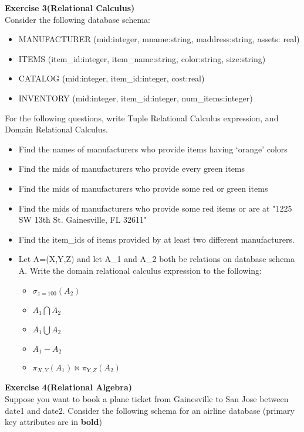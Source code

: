 \documentclass[12pt]{article}
\begin{document}
\newpage
\textbf{Exercise 3(Relational Calculus)}\\

Consider the following database schema:
\begin{itemize}
\item MANUFACTURER (mid:integer, mname:string, maddress:string, assets: real)
\item ITEMS (item\_id:integer, item\_name:string, color:string, size:string)
\item CATALOG (mid:integer, item\_id:integer, cost:real)
\item INVENTORY (mid:integer, item\_id:integer, num\_items:integer)
\end{itemize}
For the following questions, write Tuple Relational Calculus
expression, and Domain Relational Calculus.
\begin{itemize}
\item
Find the names of manufacturers who provide items having ‘orange’ colors 
\item
Find the mids of manufacturers who provide every green items 
\item
Find the mids of manufacturers who provide some red or green items
\item 
Find the mids of manufacturers who provide some red items or are at "1225 SW 13th St.
Gainesville, FL 32611"
\item
Find the item\_ids of items provided by at least two different manufacturers.
\item 
Let A=(X,Y,Z) and let A\_1 and A\_2 both be relations on database schema A.
Write the domain relational calculus expression to the following:
\begin{itemize}
\item $\sigma_{z=100}(A_2)$
\item $A_1 \bigcap A_2$
\item $A_1 \bigcup A_2$
\item $A_1 - A_2$
\item $\pi_{X,Y}(A_1) \bowtie \pi_{Y,Z}(A_2)$
\end{itemize}
\end{itemize}


\newpage
\textbf{Exercise 4(Relational Algebra)}\\

Suppose you want to book a plane ticket
from Gainesville to San Jose between date1 and date2. Consider the following schema for an airline database
(primary key attributes are in \textbf{bold})
\end{document}
